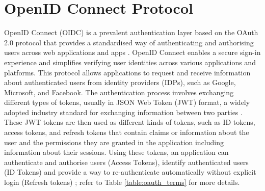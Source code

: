 \section{OpenID Connect Protocol}
OpenID Connect (OIDC) is a prevalent authentication layer based on the OAuth 2.0 protocol that provides a standardised way of authenticating and authorising users across web applications and apps \citep{oidc_intro}. OpenID Connect enables a secure sign-in experience and simplifies verifying user identities across various applications and platforms. This protocol allows applications to request and receive information about authenticated users from identity providers (IDPs), such as Google, Microsoft, and Facebook. The authentication process involves exchanging different types of tokens, usually in JSON Web Token (JWT) format, a widely adopted industry standard for exchanging information between two parties \citep{jwt}. These JWT tokens are then used as different kinds of tokens, such as ID tokens, access tokens, and refresh tokens that contain claims or information about the user and the permissions they are granted in the application including information about their sessions. Using these tokens, an application can authenticate and authorise users (Access Tokens), identify authenticated users (ID Tokens) and provide a way to re-authenticate automatically without explicit login (Refresh tokens) \citep{oidc_tokens}; refer to Table \ref{table:oauth_terms} for more details. 
\newpage
\begingroup
\centering
\setlength{\tabcolsep}{6.5pt} %
